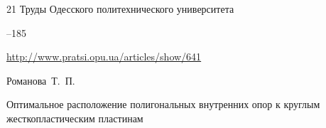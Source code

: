 \begin{thebibliography}{21}
\jour Труды Одесского политехнического университета



--185

\elink \url{http://www.pratsi.opu.ua/articles/show/641}



































\by Романова~Т.~П.

\paper Оптимальное расположение полигональных внутренних опор к круглым жесткопластическим пластинам


\end{thebibliography}
